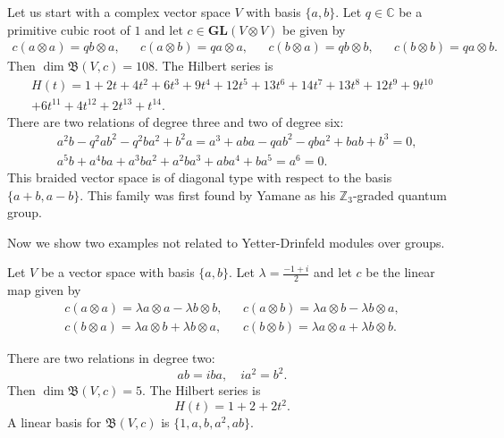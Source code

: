 \documentclass[graybox]{svmult}
\newcommand{\Z}{\mathbb{Z}}
\newcommand{\C}{\mathbb{C}}
\newcommand{\NA}{\mathfrak{B}}
\newcommand{\GL}{\mathbf{GL}}
\begin{document}
\begin{example}[Yamane]
Let us start with a complex vector space $V$ with basis $\{a,b\}$. Let
$q\in\C$ be a primitive cubic root of $1$ and let $c\in\GL(V\otimes V)$ be
given by
\begin{align*}
	c(a\otimes a)=qb\otimes a,&&
	c(a\otimes b)=qa\otimes a,&&
	c(b\otimes a)=qb\otimes b,&&
	c(b\otimes b)=qa\otimes b.
\end{align*}
Then $\dim\NA(V,c)=108$. The Hilbert series is
\begin{multline*}
H(t)=1+2t+ 4t^2+ 6t^3+ 9t^4+ 12t^5+ 13t^6
+ 14t^7+ 13t^8+ 12t^9+ 9t^{10}\\+ 6t^{11}+ 4t^{12}+ 2t^{13}+t^{14}.
\end{multline*}
There are two relations of degree three and two of degree six:
\begin{align*}
&a^2b -q^2ab^2 -q^2ba^2 + b^2a=
a^3 + aba -qab^2 -qba^2 + bab + b^3=0,\\
&a^5b + a^4ba + a^3ba^2 + a^2ba^3 + aba^4 + ba^5=
a^6=0.
\end{align*}
This braided vector space is of diagonal type with respect to the basis
$\{a+b,a-b\}$. %
This family was first found by Yamane as his $\Z_3$-graded quantum group.
\end{example}

Now we show two examples not related to Yetter-Drinfeld modules over groups.

\begin{example}[Rowell]
Let $V$ be a vector space with basis $\{a,b\}$. Let
$\lambda=\frac{-1+i}{2}$ and let $c$ be the linear map given by
\begin{align*}
c(a\otimes a)=\lambda a\otimes a-\lambda b\otimes b, && 
c(a\otimes b)=\lambda a\otimes b-\lambda b\otimes a,\\
c(b\otimes a)=\lambda a\otimes b+\lambda b\otimes a, &&
c(b\otimes b)=\lambda a\otimes a+\lambda b\otimes b.
\end{align*}

There are two relations in degree two:
\[
	ab=iba,\quad
	ia^2=b^2.
\]
Then $\dim\NA(V,c)=5$. The Hilbert series is 
\[
    H(t)=1+2+2t^2.
\]
A linear basis for $\NA(V,c)$ is $\{1,a,b,a^2,ab\}$. 
\end{example}

\begin{example}[Rowell]
	
\end{example}
\end{document}
